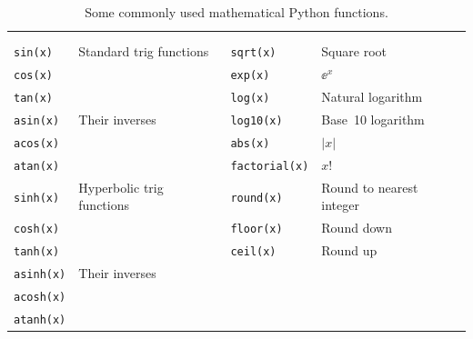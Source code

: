 \hspace{-10mm}
\begin{table}
\caption{\label{tab:builtin} Some commonly used mathematical Python functions.}
\begin{tabular}{|p{20mm} p{40mm} | p{20mm} p{40mm}|}
\multicolumn{4}{c}{}\\
\multicolumn{4}{c}{}\\
\toprule
\texttt{sin(x)}   & Standard trig functions   & \texttt{sqrt(x)}    & Square root  \\
\texttt{cos(x)}   &                           & \texttt{exp(x)}     & $\ee^x$      \\
\texttt{tan(x)}   &                           & \texttt{log(x)}     & Natural logarithm \\
\texttt{asin(x)}  & Their inverses            & \texttt{log10(x)}   & Base~10 logarithm \\
\texttt{acos(x)}  &                           & \texttt{abs(x)}     & $|x|$         \\
\texttt{atan(x)}  &                           & \texttt{factorial(x)} & $x!$ \\
\texttt{sinh(x)}  & Hyperbolic trig functions & \texttt{round(x)}   & Round to nearest integer \\
\texttt{cosh(x)}  &                           & \texttt{floor(x)}   & Round down     \\
\texttt{tanh(x)}  &                           & \texttt{ceil(x)}    & Round up       \\
\texttt{asinh(x)} & Their inverses            &  & \\
\texttt{acosh(x)} &                           &  & \\
\texttt{atanh(x)} &                           &  & \\
\bottomrule
\end{tabular}
\end{table}







